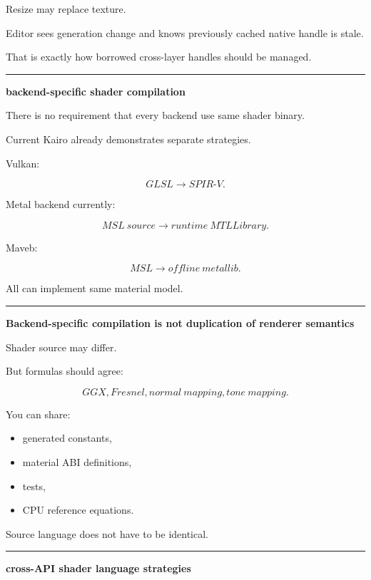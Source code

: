 Resize may replace texture.

Editor sees generation change and knows previously cached native handle is stale.

That is exactly how borrowed cross-layer handles should be managed.

\begin{center}\rule{0.5\linewidth}{0.5pt}\end{center}

\textbf{backend-specific shader compilation}

There is no requirement that every backend use same shader binary.

Current Kairo already demonstrates separate strategies.

Vulkan:

\[
GLSL
\rightarrow
SPIR\text{-}V.
\]

Metal backend currently:

\[
MSL\ source
\rightarrow
runtime\ MTLLibrary.
\]

Maveb:

\[
MSL
\rightarrow
offline\ metallib.
\]

All can implement same material model.

\begin{center}\rule{0.5\linewidth}{0.5pt}\end{center}

\textbf{Backend-specific compilation is not duplication of renderer semantics}

Shader source may differ.

But formulas should agree:

\[
GGX,
Fresnel,
normal\ mapping,
tone\ mapping.
\]

You can share:

\begin{itemize}
\tightlist
\item
  generated constants,
\item
  material ABI definitions,
\item
  tests,
\item
  CPU reference equations.
\end{itemize}

Source language does not have to be identical.

\begin{center}\rule{0.5\linewidth}{0.5pt}\end{center}

\textbf{cross-API shader language strategies}

